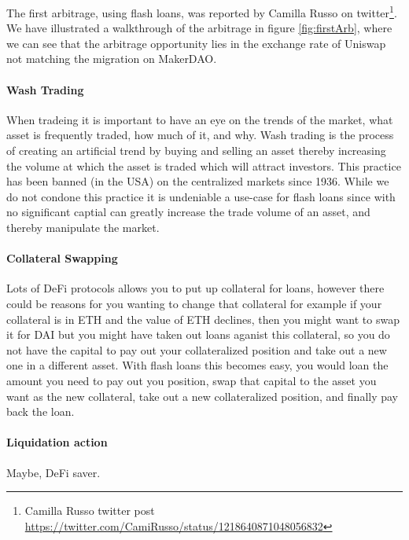 The first arbitrage, using flash loans, was reported by Camilla Russo on twitter\footnote{Camilla Russo twitter post \url{https://twitter.com/CamiRusso/status/1218640871048056832}}. We have illustrated a walkthrough of the arbitrage in figure \ref{fig:firstArb}, where we can see that the arbitrage opportunity lies in the exchange rate of Uniswap not matching the migration on MakerDAO.

\paragraph{Wash Trading} When tradeing it is important to have an eye on the trends of the market, what asset is frequently traded, how much of it, and why. Wash trading is the process of creating an artificial trend by buying and selling an asset thereby increasing the volume at which the asset is traded which will attract investors. This practice has been banned (in the USA) on the centralized markets since 1936. While we do not condone this practice it is undeniable a use-case for flash loans since with no significant captial can greatly increase the trade volume of an asset, and thereby manipulate the market.

\paragraph{Collateral Swapping} Lots of DeFi protocols allows you to put up collateral for loans, however there could be reasons for you wanting to change that collateral for example if your collateral is in ETH and the value of ETH declines, then you might want to swap it for DAI but you might have taken out loans aganist this collateral, so you do not have the capital to pay out your collateralized position and take out a new one in a different asset. With flash loans this becomes easy, you would loan the amount you need to pay out you position, swap that capital to the asset you want as the new collateral, take out a new collateralized position, and finally pay back the loan.

\paragraph{Liquidation action} Maybe, DeFi saver.